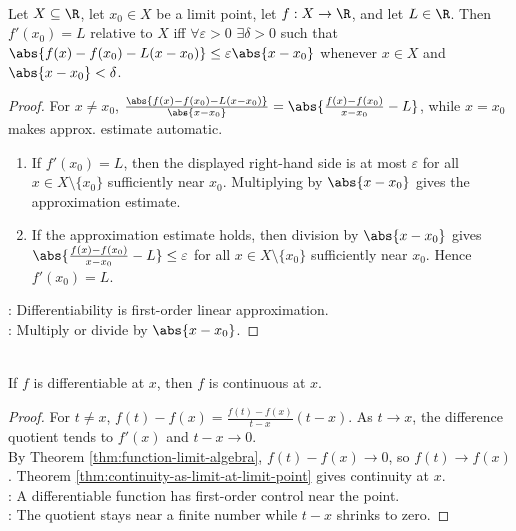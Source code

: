 \begin{proposition} \label{prop:one-variable-first-order-approximation} \\
Let $X\subseteq\R$, let $x_0\in X$ be a limit point, let $f:X\to\R$, and let $L\in\R$. Then $f'(x_0)=L$ relative to $X$ iff $\forall \varepsilon>0$ $\exists \delta>0$ such that $\abs{f(x)-f(x_0)-L(x-x_0)}\leq \varepsilon\abs{x-x_0}$ whenever $x\in X$ and $\abs{x-x_0}<\delta$.
\begin{proof}
For $x\neq x_0$, $\frac{\abs{f(x)-f(x_0)-L(x-x_0)}}{\abs{x-x_0}} = \abs{\frac{f(x)-f(x_0)}{x-x_0}-L}$, while $x=x_0$ makes approx. estimate automatic.
\begin{enumerate}[label=\roman*.]
\setlength{\itemsep}{0pt}
\item[$(\Rightarrow)$] If $f'(x_0)=L$, then the displayed right-hand side is at most $\varepsilon$ for all $x\in X\setminus\{x_0\}$ sufficiently near $x_0$. Multiplying by $\abs{x-x_0}$ gives the approximation estimate.
\item[$(\Leftarrow)$] If the approximation estimate holds, then division by $\abs{x-x_0}$ gives $\abs{\frac{f(x)-f(x_0)}{x-x_0}-L}\leq\varepsilon$ for all $x\in X\setminus\{x_0\}$ sufficiently near $x_0$. Hence $f'(x_0)=L$.
\end{enumerate}
: Differentiability is first-order linear approximation.\\
: Multiply or divide by $\abs{x-x_0}$.
\end{proof}
\end{proposition}

\begin{theorem} \label{thm:differentiable-implies-continuous}\label{thm:one-variable-differentiation-main-source-todo} \\
If $f$ is differentiable at $x$, then $f$ is continuous at $x$.
\begin{proof}
For $t\neq x$, $f(t)-f(x)=\frac{f(t)-f(x)}{t-x}(t-x)$. As $t\to x$, the difference quotient tends to $f'(x)$ and $t-x\to0$.\\
By Theorem \ref{thm:function-limit-algebra}, $f(t)-f(x)\to0$, so $f(t)\to f(x)$. Theorem \ref{thm:continuity-as-limit-at-limit-point} gives continuity at $x$.\\
: A differentiable function has first-order control near the point.\\
: The quotient stays near a finite number while $t-x$ shrinks to zero.
\end{proof}
\end{theorem}

